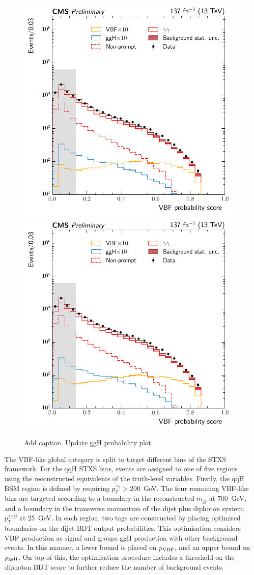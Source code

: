 \begin{figure}[hptb]
  \centering
  \includegraphics[width=.49\textwidth]{Figures/hgg_overview/DijetBDT_VBFprob.pdf}
  \includegraphics[width=.49\textwidth]{Figures/hgg_overview/DijetBDT_VBFprob.pdf}
  \caption[Dijet BDT output probabilities: $p_{\rm{VBF}}$ and $p_{\rm{ggH}}$]
  {
    Add caption. Update ggH probability plot.
  }
  \label{fig:categorisation_vhlep}
\end{figure}

The VBF-like global category is split to target different bins of the STXS framework. For the qqH STXS bins, events are assigned to one of five regions using the reconstructed equivalents of the truth-level variables. Firstly, the qqH BSM region is defined by requiring $p_T^{\gamma\gamma}>200$~GeV. The four remaining VBF-like bins are targeted according to a boundary in the reconstructed $m_{jj}$ at 700~GeV, and a boundary in the transverse momentum of the dijet plus diphoton system, $p_T^{\gamma\gamma jj}$ at 25~GeV. In each region, two tags are constructed by placing optimised boundaries on the dijet BDT output probabilities. This optimisation considers VBF production as signal and groups ggH production with other background events. In this manner, a lower bound is placed on $p_{\rm{VBF}}$, and an upper bound on $p_{\rm{ggH}}$. On top of this, the optimisation procedure includes a threshold on the diphoton BDT score to further reduce the number of background events.

